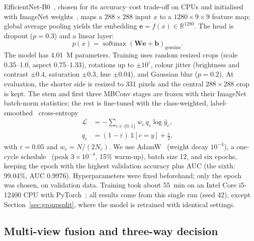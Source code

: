 \documentclass[pdflatex,iicol,sn-mathphys-num]{sn-jnl}
\begin{document}
EfficientNet-B0~\cite{tan2019efficientnet}, chosen for its accuracy--cost trade-off on
CPUs and initialised with ImageNet weights~\cite{deng2009imagenet}, maps a
$288\times288$ input $x$ to a $1280\times9\times9$ feature map; global average pooling
yields the embedding $\mathbf{e}=f(x)\in\mathbb{R}^{1280}$. The head is dropout
($p=0.3$) and a linear layer:
\begin{equation}
p(x) = \operatorname{softmax}\!\left(\mathbf{W}\mathbf{e}+\mathbf{b}\right)_{\text{genuine}} .
\label{eq:prob}
\end{equation}
The model has 4.01~M parameters. Training uses random resized crops (scale 0.35--1.0,
aspect 0.75--1.33), rotations up to $\pm10^\circ$, colour jitter (brightness and contrast
$\pm0.4$, saturation $\pm0.3$, hue $\pm0.04$), and Gaussian blur ($p=0.2$). At
evaluation, the shorter side is resized to 331 pixels and the central $288\times288$
crop is kept. The stem and first three MBConv stages are frozen with their ImageNet
batch-norm statistics; the rest is fine-tuned with the class-weighted,
label-smoothed~\cite{szegedy2016inception} cross-entropy
\begin{align}
\mathcal{L} &= -\sum_{c\in\{0,1\}} w_c\, q_c \log \hat{y}_c, \nonumber\\
q_c &= (1-\varepsilon)\,\mathbb{1}[c=y] + \tfrac{\varepsilon}{2},
\label{eq:loss}
\end{align}
with $\varepsilon=0.05$ and $w_c=N/(2N_c)$. We use AdamW~\cite{loshchilov2019adamw}
(weight decay $10^{-4}$), a one-cycle schedule~\cite{smith2019superconvergence} (peak
$3\times10^{-4}$, 15\% warm-up), batch size 12, and six epochs, keeping the epoch with
the highest validation accuracy plus AUC (the sixth: 99.04\%, AUC 0.9976).
Hyperparameters were fixed beforehand; only the epoch was chosen, on validation data. Training took about 55~min on an Intel Core i5-12400 CPU with
PyTorch~\cite{paszke2019pytorch}; all results come from this single run (seed 42),
except Section~\ref{sec:groupsplit}, where the model is retrained with identical settings.

\subsection{Multi-view fusion and three-way decision}\label{sec:decision}
\end{document}
